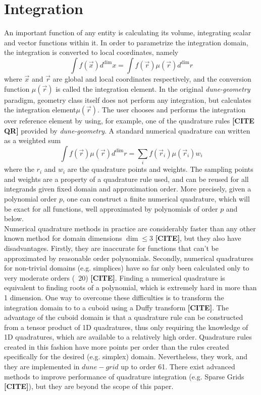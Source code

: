 \section{Integration}

An important function of any entity is calculating its volume, integrating scalar and vector functions within it. In order to parametrize the integration domain, the integration is converted to local coordinates, namely
\[ \int f(\vec{x}) d^{\dim} x = \int f(\vec{r}) \mu(\vec{r}) d^{\dim} r \]
where $\vec{x}$ and $\vec{r}$ are global and local coordinates respectively, and the conversion function $\mu(\vec{r})$ is called the integration element. In the original \textit{dune-geometry} paradigm, geometry class itself does not perform any integration, but calculates the integration element$\mu(\vec{r})$. The user chooses and performs the integration over reference element by using, for example, one of the quadrature rules \textbf{[CITE QR]} provided by \textit{dune-geometry}. A standard numerical quadrature can written as a weighted sum
\[ \int f(\vec{r}) \mu(\vec{r}) d^{\dim} r = \sum_i f(\vec{r}_i) \mu(\vec{r}_i) w_i  \]
where the $r_i$ and $w_i$ are the quadrature points and weights. The sampling points and weights are a property of a quadrature rule used, and can be reused for all integrands given fixed domain and approximation order. More precisely, given a polynomial order $p$, one can construct a finite numerical quadrature, which will be exact for all functions, well approximated by polynomials of order $p$ and below. \\

\noindent
Numerical quadrature methods in practice are considerably faster than any other known method for domain dimensions $\dim \leq 3$ \textbf{[CITE]}, but they also have disadvantages. Firstly, they are inaccurate for functions that can't be approximated by reasonable order polynomials. Secondly, numerical quadratures for non-trivial domains (e.g. simplices) have so far only been calculated only to very moderate orders (~20) \textbf{[CITE]}. Finding a numerical quadrature is equivalent to finding roots of a polynomial, which is extremely hard in more than 1 dimension. One way to overcome these difficulties is to transform the integration domain to to a cuboid using a Duffy transform \textbf{[CITE]}. The advantage of the cuboid domain is that a quadrature rule can be constructed from a tensor product of 1D quadratures, thus only requiring the knowledge of 1D quadratures, which are available to a relatively high order. Quadrature rules created in this fashion have more points per order than the rules created specifically for the desired (e.g. simplex) domain. Nevertheless, they work, and they are implemented in $dune-grid$ up to order 61. There exist advanced methods to improve performance of quadrature integration (e.g. Sparse Grids \textbf{[CITE]}), but they are beyond the scope of this paper. \\

